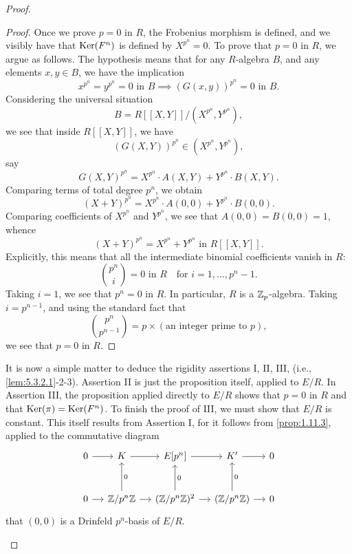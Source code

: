 \begin{proof}
\begin{proof}
Once we prove $p = 0$ in $R$, the Frobenius morphism is defined, and we visibly have that $\operatorname{Ker}(F^n)$ is defined by $X^{p^n} = 0$. To prove that $p = 0$ in $R$, we argue as follows. The hypothesis means that for any $R$-algebra $B$, and any elements $x, y \in B$, we have the implication
\[
x^{p^n} = y^{p^n} = 0 \text{ in } B \implies (G(x,y))^{p^n} = 0 \text{ in } B.
\]
Considering the universal situation
\[
B = R[[X,Y]]/(X^{p^n}, Y^{p^n}),
\]
we see that inside $R[[X,Y]]$, we have
\[
(G(X,Y))^{p^n} \in (X^{p^n}, Y^{p^n}),
\]
say
\[
G(X,Y)^{p^n} = X^{p^n}\cdot A(X,Y) + Y^{p^n}\cdot B(X,Y).
\]
Comparing terms of total degree $p^n$, we obtain
\[
(X+Y)^{p^n} = X^{p^n}\cdot A(0,0) + Y^{p^n}\cdot B(0,0).
\]
Comparing coefficients of $X^{p^n}$ and $Y^{p^n}$, we see that $A(0,0) = B(0,0) = 1$, whence
\[
(X+Y)^{p^n} = X^{p^n} + Y^{p^n} \text{ in } R[[X,Y]].
\]
Explicitly, this means that all the intermediate binomial coefficients vanish in $R$:
\[
\binom{p^n}{i} = 0 \text{ in } R \quad\text{for } i = 1, \ldots, p^n - 1.
\]
Taking $i = 1$, we see that $p^n = 0$ in $R$. In particular, $R$ is a $\mathbb{Z}_p$-algebra. Taking $i = p^{n-1}$, and using the standard fact that
\[
\binom{p^n}{p^{n-1}} = p \times (\text{an integer prime to } p),
\]
we see that $p = 0$ in $R$.
\end{proof}

\begin{pitem}\label{lem:5.3.5}
It is now a simple matter to deduce the rigidity assertions I, II, III, (i.e., \ref{lem:5.3.2.1}-2-3). Assertion II is just the proposition itself, applied to $E/R$. In Assertion III, the proposition applied directly to $E/R$ shows that $p = 0$ in $R$ and that $\operatorname{Ker}(\pi) = \operatorname{Ker}(F^n)$. To finish the proof of III, we must show that $E/R$ is constant. This itself results from Assertion I, for it follows from \ref{prop:1.11.3}, applied to the commutative diagram
\begin{equation}\label{eq:5.3.5.1}
\begin{tikzcd}[row sep=large, column sep=small]
0 \arrow[r] & K \arrow[r] & E[p^n] \arrow[r] & K' \arrow[r] & 0 \\
0 \arrow[r] & \Z/p^n\Z \arrow[r] \arrow[u, "0"'] & (\Z/p^n\Z)^2 \arrow[r] \arrow[u, "0"'] & (\Z/p^n\Z) \arrow[r] \arrow[u, "0"'] & 0
\end{tikzcd}
\end{equation}
that $(0,0)$ is a Drinfeld $p^n$-basis of $E/R$.
\end{pitem}


\end{proof}
